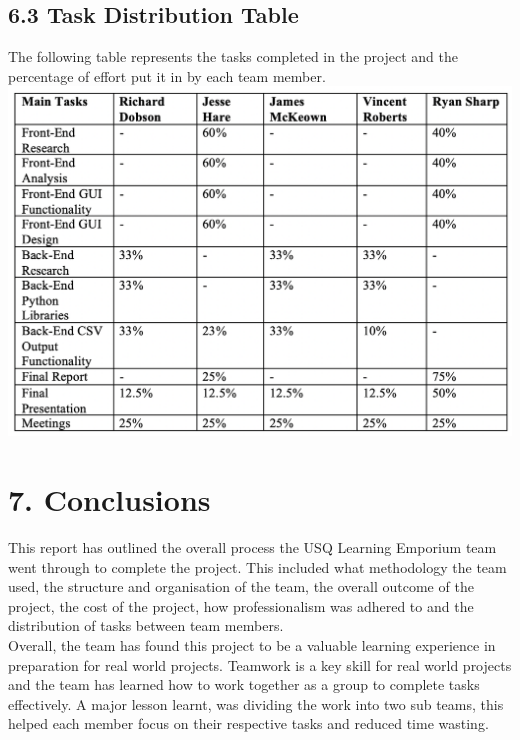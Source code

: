 \documentclass[11pt]{article}
\begin{document}
\subsection{6.3 Task Distribution Table}
The following table represents the tasks completed in the project and the percentage of effort put it in by each team member. \\

\includegraphics[scale=0.7]{task_distro.png} \\

\newpage



\section{7. Conclusions}
This report has outlined the overall process the USQ Learning Emporium team went through to complete the project. This included what methodology the team used, the structure and organisation of the team, the overall outcome of the project, the cost of the project, how professionalism was adhered to and the distribution of tasks between team members. \\

Overall, the team has found this project to be a valuable learning experience in preparation for real world projects. Teamwork is a key skill for real world projects and the team has learned how to work together as a group to complete tasks effectively. A major lesson learnt, was dividing the work into two sub teams, this helped each member focus on their respective tasks and reduced time wasting. \\
\end{document}
